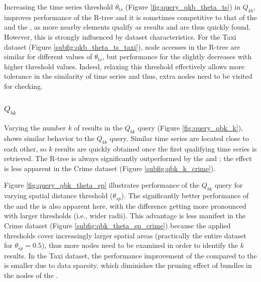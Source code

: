 Increasing the time series threshold $\theta_{ts}$ (Figure \ref{fig:query_qkb_theta_ts}) in $Q_{kb}$, improves performance of the R-tree and it is sometimes competitive to that of the \tsr and the \ctsr, as more nearby elements qualify as results and are thus quickly found. However, this is strongly influenced by dataset characteristics. For the Taxi dataset (Figure \ref{subfig:qkb_theta_ts_taxi}), node accesses in the R-tree are similar for different values of $\theta_{ts}$, but performance for the \ctsr slightly decreases with higher threshold values. Indeed, relaxing this threshold effectively allows more tolerance in the similarity of time series and thus, extra nodes need to be visited for checking. %


\subsubsection{$Q_{bk}$}
Varying the number $k$ of results in the $Q_{bk}$ query (Figure \ref{fig:query_qbk_k}), shows similar behavior to the $Q_{kb}$ query. Similar time series are located close to each other, so $k$ results are quickly obtained once the first qualifying time series is retrieved. The R-tree is always significantly outperformed by the \tsr and \ctsr;  the effect is less apparent in the Crime dataset (Figure \ref{subfig:qbk_k_crime}).


Figure \ref{fig:query_qbk_theta_sp} illustrates performance of the $Q_{bk}$ query for varying spatial distance threshold ($\theta_{sp}$). The significantly better performance of the \tsr and the \ctsr is also apparent here, with the difference getting more pronounced with larger thresholds (i.e., wider radii). This advantage is less manifest in the Crime dataset (Figure \ref{subfig:qbk_theta_sp_crime}) because the applied thresholds cover increasingly larger spatial areas (practically the entire dataset for $\theta_{sp} =0.5$), thus more nodes need to be examined in order to identify the $k$ results. In the Taxi dataset, the performance improvement of the \ctsr compared to the \tsr is smaller due to data sparsity, which diminishes the pruning effect of bundles in the nodes of the \ctsr.


